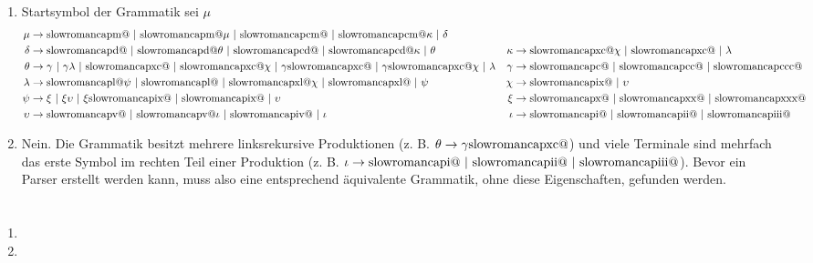 \documentclass[a4paper,10pt]{scrartcl}
\makeatletter
\newcommand{\Rm}[1]{\textrm{\expandafter\@slowromancap\romannumeral #1@}}
\makeatother
\begin{document}
\section{}
\begin{enumerate}
 \item  Startsymbol der Grammatik sei $\mu$
        \begin{align*}
         \mu &\to \Rm{1000}\ |\ \Rm{1000}\mu\ |\ \Rm{900}\ |\ \Rm{900}\kappa\ |\ \delta && \\
         \delta &\to \Rm{500}\ |\ \Rm{500}\theta\ |\ \Rm{400}\ |\ \Rm{400}\kappa\ |\ \theta &
            \kappa &\to \Rm{90}\chi\ |\ \Rm{90}\ |\ \lambda \\
        \theta &\to \gamma\ |\ \gamma\lambda\ |\ \Rm{90}\ |\ \Rm{90}\chi\ |\ \gamma \Rm{90}\ |\ \gamma \Rm{90}\chi\ |\ \lambda &
            \gamma &\to \Rm{100}\ |\ \Rm{200}\ |\ \Rm{300} \\
        \lambda &\to \Rm{50}\psi\ |\ \Rm{50}\ |\ \Rm{40}\chi\ |\ \Rm{40}\ |\ \psi &
            \chi &\to \Rm{9}\ |\ \upsilon \\
        \psi &\to \xi\ |\ \xi\upsilon\ |\ \xi \Rm{9}\ |\ \Rm{9}\ |\ \upsilon &
            \xi &\to \Rm{10}\ |\ \Rm{20}\ |\ \Rm{30} \\
        \upsilon &\to \Rm{5}\ |\ \Rm{5}\iota\ |\ \Rm{4}\ |\ \iota &
            \iota &\to \Rm{1}\ |\ \Rm{2}\ |\ \Rm{3}
        \end{align*}
 \item  Nein. Die Grammatik besitzt mehrere linksrekursive Produktionen (z. B. $\theta \to \gamma\Rm{90}$) und viele Terminale  
        sind mehrfach das erste Symbol im rechten Teil einer Produktion (z. B. $\iota \to \Rm{1}\ |\ \Rm{2}\ |\ \Rm{3}$).
        Bevor ein Parser erstellt werden kann, muss also eine entsprechend äquivalente Grammatik, ohne diese Eigenschaften, gefunden werden.
\end{enumerate}

\section{}
\begin{enumerate}
 \item  
 \item  
\end{enumerate}
\end{document}
